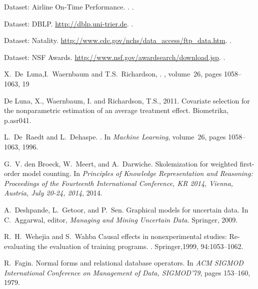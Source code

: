 \begin{thebibliography}{10}
{Dataset: Airline On-Time Performance}.
.
.

{Dataset: DBLP}.
\newblock \mbox{\url{http://dblp.uni-trier.de}}.
.

{Dataset: Natality}.
\newblock \mbox{\url{http://www.cdc.gov/nchs/data_access/ftp_data.htm}}.
.

{Dataset: NSF Awards}.
\newblock \mbox{\url{http://www.nsf.gov/awardsearch/download.jsp}}.
.


 X.~De~Luna,I.~Waernbaum and T.S.~Richardson,
.
, volume~26, pages 1058--1063, 19


De Luna, X., Waernbaum, I. and Richardson, T.S., 2011. Covariate selection for the nonparametric estimation of an average treatment effect. Biometrika, p.asr041.

L.~De~Raedt and L.~Dehaspe.
.
\newblock In {\em Machine Learning}, volume~26, pages 1058--1063, 1996.

G.~V. den Broeck, W.~Meert, and A.~Darwiche.
\newblock Skolemization for weighted first-order model counting.
\newblock In {\em Principles of Knowledge Representation and Reasoning:
  Proceedings of the Fourteenth International Conference, {KR} 2014, Vienna,
  Austria, July 20-24, 2014}, 2014.

A.~Deshpande, L.~Getoor, and P.~Sen.
\newblock Graphical models for uncertain data.
\newblock In C.~Aggarwal, editor, {\em Managing and Mining Uncertain Data}.
  Springer, 2009.

R.~H.~Wehejia and S.~Wahba
\newblock Causal effects in nonexperimental
studies: Re-evaluating the evaluation of training
programs.
.
  Springer,1999, 94:1053–1062.




R.~Fagin.
\newblock Normal forms and relational database operators.
\newblock In {\em {ACM} {SIGMOD} International Conference on Management of
  Data, SIGMOD'79}, pages 153--160, 1979.


\end{thebibliography}

